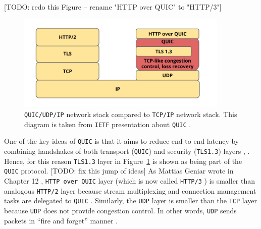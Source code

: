 \documentclass[12pt,a4paper,twoside,openright]{report}
\begin{document}
[TODO: redo this Figure -- rename "HTTP over QUIC" to "HTTP/3"]
    \begin{figure}[ht]
    \centering
    \includegraphics[width=0.9\textwidth]{figs/QUIC_network_stack.PNG}
    \caption{\texttt{QUIC/UDP/IP} network stack compared to \texttt{TCP/IP} network stack. This diagram is taken from \texttt{IETF} presentation about \texttt{QUIC} \cite{IETF_presentation_about_QUIC}.}
    \label{fig:QUIC_network_stack}
    \end{figure}

One of the key ideas of \texttt{QUIC} is that it aims to reduce end-to-end latency by combining handshakes of both transport (\texttt{QUIC}) and security (\texttt{TLS1.3}) layers \cite{Google_QUIC_protocol_moving_the_web_from_TCP_to_UDP}, \cite{HTTP_3_the_past_the_present_and_the_future}. Hence, for this reason \texttt{TLS1.3} layer in Figure~\ref{fig:QUIC_network_stack} is shown as being part of the \texttt{QUIC} protocol. 
[TODO: fix this jump of ideas]
As Mattias Geniar wrote in Chapter 12 \cite{Google_QUIC_protocol_moving_the_web_from_TCP_to_UDP},
\texttt{HTTP over QUIC} layer (which is now called \texttt{HTTP/3} \cite{HTTP_3_the_past_the_present_and_the_future}) is smaller than analogous \texttt{HTTP/2} layer because stream multiplexing and connection management tasks are delegated to \texttt{QUIC} \cite{bib_grigorik2013}.
Similarly, the \texttt{UDP} layer is smaller than the \texttt{TCP} layer because \texttt{UDP} does not provide congestion control. 
In other words, \texttt{UDP} sends packets in \enquote{fire and forget} manner \cite{Google_QUIC_protocol_moving_the_web_from_TCP_to_UDP}.
\end{document}
